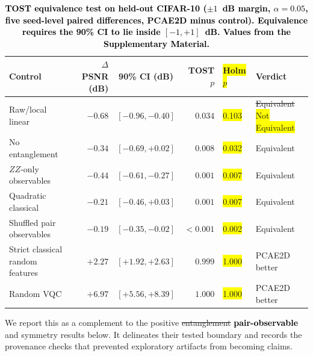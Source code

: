 \documentclass[pdflatex,sn-basic]{sn-jnl}
\newcommand{\yellowinline}[1]{\colorbox{yellow}{#1}}
\newcommand{\del}[1]{\sout{#1}}
\newcommand{\add}[1]{\textbf{\textcolor{black}{#1}}}
\begin{document}
\begin{table}[t]
  \centering
  \caption[TOST equivalence test on held-out CIFAR-10]{\add{TOST equivalence
           test on held-out CIFAR-10 ($\pm1$~dB margin, $\alpha=0.05$, five
           seed-level paired differences, PCAE2D minus control). Equivalence
           requires the 90\% CI to lie inside $[-1,+1]$~dB. Values from the
           Supplementary Material.}}
  \label{tab:tost_main}
  \footnotesize\bfseries
  \setlength{\tabcolsep}{2.5pt}
  \begin{tabular}{@{}l r c r l l@{}}
    \toprule
    Control                          & $\Delta$PSNR (dB) & 90\% CI (dB)       & TOST $p$ & \yellowinline{Holm $p$}  & Verdict \\
    \midrule
    Raw/local linear                 & $-0.68$ & $[-0.96,-0.40]$ & $0.034$ & \yellowinline{0.103}  & \del{Equivalent} \yellowinline{Not Equivalent} \\
    No entanglement                  & $-0.34$ & $[-0.69,+0.02]$ & $0.008$ & \yellowinline{0.032}   & Equivalent \\
    $ZZ$-only observables            & $-0.44$ & $[-0.61,-0.27]$ & $0.001$ & \yellowinline{0.007}   & Equivalent \\
    Quadratic classical              & $-0.21$ & $[-0.46,+0.03]$ & $0.001$  & \yellowinline{0.007} & Equivalent \\
    Shuffled pair observables        & $-0.19$ & $[-0.35,-0.02]$ & $<0.001$ & \yellowinline{0.002} & Equivalent \\
    Strict classical random features & $+2.27$ & $[+1.92,+2.63]$ & $0.999$  & \yellowinline{1.000} & PCAE2D better \\
    Random VQC                       & $+6.97$ & $[+5.56,+8.39]$ & $1.000$ & \yellowinline{1.000}  & PCAE2D better \\
    \bottomrule
  \end{tabular}
\end{table} We report this as a complement to the positive \del{entanglement} \add{pair-observable}
and symmetry results below. It delineates their tested boundary and records the
provenance checks that prevented exploratory artifacts from becoming claims.
\end{document}
